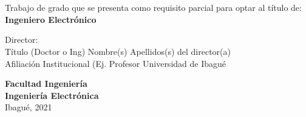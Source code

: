 \begin{titlepage}

\center %


\makeatletter
{ \LARGE \bfseries \thesistitle}\\[1.5cm] %
 
\vspace*{6\baselineskip}

{ \Large \bfseries \authorname}\\[0.7cm] 

\vspace*{2\baselineskip}
\large{ Trabajo de grado que se presenta como requisito parcial para optar al título de:\\
\textbf{Ingeniero Electrónico}}

\vspace*{5\baselineskip}

\large{ Director:\\
Título (Doctor o Ing) Nombre(s) Apellidos(s) del director(a)\\
Afiliación Institucional (Ej. Profesor Universidad de Ibagué}
 
\vspace*{4\baselineskip}

\vfill
\large{ \bfseries Facultad Ingeniería\\
Ingeniería Electrónica}\\
Ibagué, 2021
\vfill

\end{titlepage}